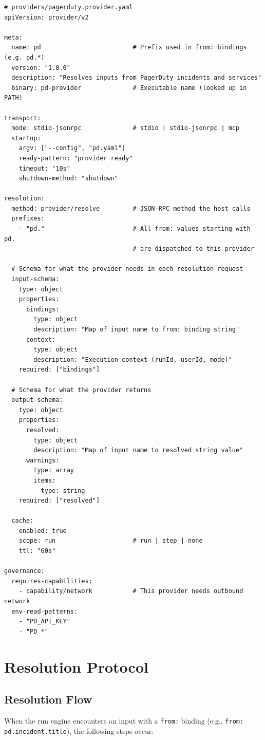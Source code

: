 \begin{verbatim}
# providers/pagerduty.provider.yaml
apiVersion: provider/v2

meta:
  name: pd                         # Prefix used in from: bindings (e.g. pd.*)
  version: "1.0.0"
  description: "Resolves inputs from PagerDuty incidents and services"
  binary: pd-provider              # Executable name (looked up in PATH)

transport:
  mode: stdio-jsonrpc              # stdio | stdio-jsonrpc | mcp
  startup:
    argv: ["--config", "pd.yaml"]
    ready-pattern: "provider ready"
    timeout: "10s"
    shutdown-method: "shutdown"

resolution:
  method: provider/resolve         # JSON-RPC method the host calls
  prefixes:
    - "pd."                        # All from: values starting with pd.
                                   # are dispatched to this provider

  # Schema for what the provider needs in each resolution request
  input-schema:
    type: object
    properties:
      bindings:
        type: object
        description: "Map of input name to from: binding string"
      context:
        type: object
        description: "Execution context (runId, userId, mode)"
    required: ["bindings"]

  # Schema for what the provider returns
  output-schema:
    type: object
    properties:
      resolved:
        type: object
        description: "Map of input name to resolved string value"
      warnings:
        type: array
        items:
          type: string
    required: ["resolved"]

  cache:
    enabled: true
    scope: run                     # run | step | none
    ttl: "60s"

governance:
  requires-capabilities:
    - capability/network           # This provider needs outbound network
  env-read-patterns:
    - "PD_API_KEY"
    - "PD_*"
\end{verbatim}

\section{Resolution Protocol}
\label{sec:provider-protocol}

\subsection{Resolution Flow}

When the run engine encounters an input with a \texttt{from:} binding (e.g.,
\texttt{from: pd.incident.title}), the following steps occur:

